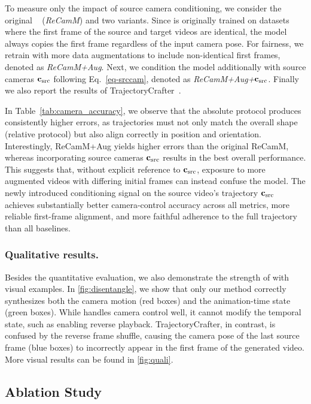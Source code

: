 To measure only the impact of source camera conditioning, we consider the original \recammaster~\cite{Bai2025} (\textit{ReCamM}) and two variants. 
Since \recammaster is originally trained on datasets where the first frame of the source and target videos are identical, the model always copies the first frame regardless of the input camera pose. 
For fairness, we retrain \recammaster with more data augmentations to include non-identical first frames, denoted as \textit{ReCamM+Aug}. 
Next, we condition the model additionally with source cameras $\mathbf{c}_{\text{src}}$ following Eq.~\ref{eq-srccam}, denoted as \textit{ReCamM+Aug+$\mathbf{c}_{\text{src}}$}. 
Finally we also report the results of TrajectoryCrafter~\cite{YU2025}.

In Table~\ref{tab:camera_accuracy}, we observe that the absolute protocol produces consistently higher errors, as trajectories must not only match the overall shape (relative protocol) but also align correctly in position and orientation.
Interestingly, ReCamM+Aug yields higher errors than the original ReCamM, whereas incorporating source cameras $\mathbf{c}_{\text{src}}$ results in the best overall performance.
This suggests that, without explicit reference to $\mathbf{c}_{\text{src}}$, exposure to more augmented videos with differing initial frames can instead confuse the model.
The newly introduced conditioning signal on the source video’s trajectory $\mathbf{c}_{\text{src}}$ achieves substantially better camera-control accuracy across all metrics, more reliable first-frame alignment, and more faithful adherence to the full trajectory than all baselines. 

\subsubsection{Qualitative results.}
Besides the quantitative evaluation, we also demonstrate the strength of \nameMethod with visual examples.
In \cref{fig:disentangle}, we show that only our method correctly synthesizes both the camera motion (red boxes) and the animation-time state (green boxes). While \recammaster handles camera control well, it cannot modify the temporal state, such as enabling reverse playback. TrajectoryCrafter, in contrast, is confused by the reverse frame shuffle, causing the camera pose of the last source frame (blue boxes) to incorrectly appear in the first frame of the generated video. More visual results can be found in \cref{fig:quali}.
\subsection{Ablation Study}

